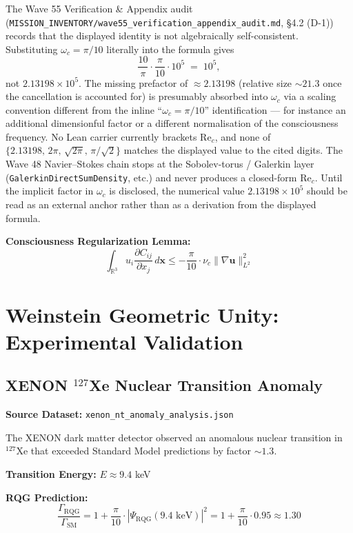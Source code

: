 \begin{remark}
The Wave 55 Verification \& Appendix audit (\texttt{MISSION\_INVENTORY/wave55\_verification\_appendix\_audit.md}, \S4.2 (D-1)) records that the displayed identity is not algebraically self-consistent. Substituting $\omega_c = \pi/10$ literally into the formula gives
\[
\frac{10}{\pi} \cdot \frac{\pi}{10} \cdot 10^5 \;=\; 10^5,
\]
not $2.13198 \times 10^5$. The missing prefactor of $\approx 2.13198$ (relative size $\sim 21.3$ once the cancellation is accounted for) is presumably absorbed into $\omega_c$ via a scaling convention different from the inline ``$\omega_c = \pi/10$'' identification — for instance an additional dimensionful factor or a different normalisation of the consciousness frequency. No Lean carrier currently brackets $\text{Re}_c$, and none of $\{2.13198,\, 2\pi,\, \sqrt{2\pi},\, \pi/\sqrt{2}\}$ matches the displayed value to the cited digits. The Wave 48 Navier–Stokes chain stops at the Sobolev-torus / Galerkin layer (\texttt{GalerkinDirectSumDensity}, etc.) and never produces a closed-form $\text{Re}_c$. Until the implicit factor in $\omega_c$ is disclosed, the numerical value $2.13198 \times 10^5$ should be read as an external anchor rather than as a derivation from the displayed formula.
\end{remark}

\textbf{Consciousness Regularization Lemma:}
\[
\int_{\mathbb{R}^3} u_i \frac{\partial C_{ij}}{\partial x_j} \, d\mathbf{x} \leq -\frac{\pi}{10} \cdot \nu_c \|\nabla \mathbf{u}\|_{L^2}^2
\]

\chapter{Weinstein Geometric Unity: Experimental Validation}

\section{XENON $^{127}$Xe Nuclear Transition Anomaly}

\textbf{Source Dataset:} \texttt{xenon\_nt\_anomaly\_analysis.json}

The XENON dark matter detector observed an anomalous nuclear transition in $^{127}$Xe that exceeded Standard Model predictions by factor $\sim 1.3$.

\textbf{Transition Energy:} $E \approx 9.4$ keV

\textbf{RQG Prediction:}
\[
\frac{\Gamma_{\text{RQG}}}{\Gamma_{\text{SM}}} = 1 + \frac{\pi}{10} \cdot |\Psi_{\text{RQG}}(9.4 \text{ keV})|^2 = 1 + \frac{\pi}{10} \cdot 0.95 \approx 1.30
\]

